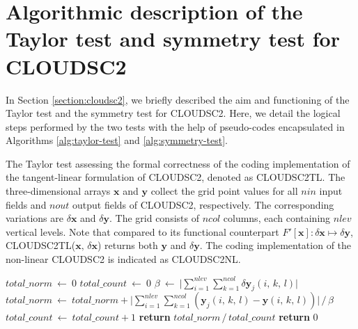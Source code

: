 \documentclass[gmd,manuscript,online]{copernicus}
\theoremstyle{theorem}
\theoremstyle{definition}
\theoremstyle{remark}
\theoremstyle{proposition}
\begin{document}
	\section{Algorithmic description of the Taylor test and symmetry test for CLOUDSC2}
	\label{section:appendix}

	In Section \ref{section:cloudsc2}, we briefly described the aim and functioning of the Taylor test and the symmetry test for CLOUDSC2. Here, we detail the logical steps performed by the two tests with the help of pseudo-codes encapsulated in Algorithms \ref{alg:taylor-test} and \ref{alg:symmetry-test}.

	\begin{algorithm}[H]
		\caption{The Taylor test assessing the formal correctness of the coding implementation of the tangent-linear formulation of CLOUDSC2, denoted as \textsc{CLOUDSC2TL}. The three-dimensional arrays $\mathbf{x}$ and $\mathbf{y}$ collect the grid point values for all $nin$ input fields and $nout$ output fields of CLOUDSC2, respectively. The corresponding variations are $\delta \mathbf{x}$ and $\delta \mathbf{y}$. The grid consists of $ncol$ columns, each containing $nlev$ vertical levels. Note that compared to its functional counterpart $F' \left[\boldsymbol{x} \right] : \delta \boldsymbol{x} \mapsto \delta \boldsymbol{y}$, \textsc{CLOUDSC2TL($\mathbf{x}, \, \delta \mathbf{x}$)} returns both $\mathbf{y}$ and $\delta \mathbf{y}$. The coding implementation of the non-linear CLOUDSC2 is indicated as \textsc{CLOUDSC2NL}.}
		\label{alg:taylor-test}

		\begin{algorithmic}[1]
			 
			\State $total\_norm ~ \gets ~ 0$
			\State $total\_count ~ \gets ~ 0$
				\State $\beta ~ \gets ~ \big| \sum_{i=1}^{nlev} \sum_{k=1}^{ncol} \delta \mathbf{y}_j \left( i, \, k, \, l \right) \big|$
					\State $total\_norm ~ \gets ~ total\_norm + \big| \sum_{i=1}^{nlev} \sum_{k=1}^{ncol} \left( \mathbf{y}_j \left( i, \, k, \, l \right) - \mathbf{y} \left( i, \, k, \, l \right) \right) \big| \, / \, \beta$
					\State $total\_count ~ \gets ~ total\_count + 1$
				\EndIf
			\EndFor
				\State \textbf{return} $total\_norm \, / \, total\_count$
			\Else
				\State \textbf{return} 0
			\EndIf
			\EndFunction


\end{algorithmic}
\end{algorithm}
\end{document}
